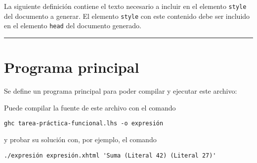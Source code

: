 La siguiente definición contiene el texto necesario a incluir en el
elemento \texttt{style} del documento a generar. El elemento
\texttt{style} con este contenido debe ser incluido en el elemento
\texttt{head} del documento generado.

\begin{Shaded}
\begin{Highlighting}[]
 
  \FunctionTok{=} 
    \NormalTok{[ }
    \NormalTok{, }
    \NormalTok{, }
    \NormalTok{, }
    \NormalTok{, }
    \NormalTok{, }
    \NormalTok{, }
    \NormalTok{, }
    \NormalTok{]}
\end{Highlighting}
\end{Shaded}

\begin{center}\rule{3in}{0.4pt}\end{center}

\section{Programa principal}\label{programa-principal}

Se define un programa principal para poder compilar y ejecutar este
archivo:

\begin{Shaded}
\begin{Highlighting}[]
  
 

  \NormalTok{()}
\FunctionTok{=} 
  \OtherTok{<-} 
   
     \FunctionTok{:} \NormalTok{_) }\OtherTok{->} 

    \NormalTok{_ }\OtherTok{->} 
      \OtherTok{<-} 
       
\end{Highlighting}
\end{Shaded}

Puede compilar la fuente de este archivo con el comando

\begin{verbatim}
ghc tarea-práctica-funcional.lhs -o expresión
\end{verbatim}

y probar su solución con, por ejemplo, el comando

\begin{verbatim}
./expresión expresión.xhtml 'Suma (Literal 42) (Literal 27)'
\end{verbatim}
